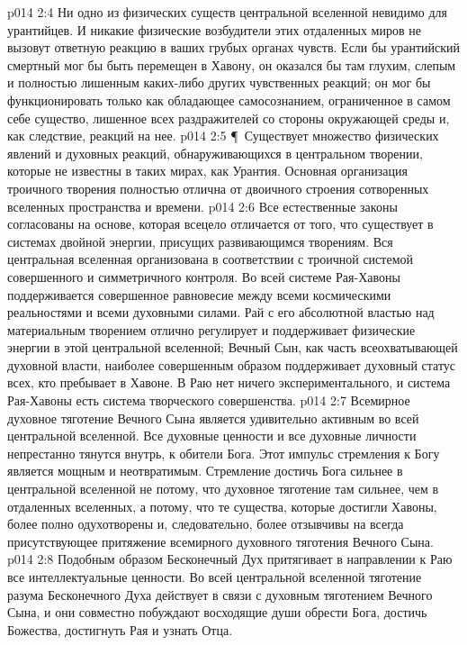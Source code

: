 \vs p014 2:4 Ни одно из физических существ центральной вселенной невидимо для урантийцев. И никакие физические возбудители этих отдаленных миров не вызовут ответную реакцию в ваших грубых органах чувств. Если бы урантийский смертный мог бы быть перемещен в Хавону, он оказался бы там глухим, слепым и полностью лишенным каких\hyp{}либо других чувственных реакций; он мог бы функционировать только как обладающее самосознанием, ограниченное в самом себе существо, лишенное всех раздражителей со стороны окружающей среды и, как следствие, реакций на нее.
\vs p014 2:5 \P\ Существует множество физических явлений и духовных реакций, обнаруживающихся в центральном творении, которые не известны в таких мирах, как Урантия. Основная организация троичного творения полностью отлична от двоичного строения сотворенных вселенных пространства и времени.
\vs p014 2:6 Все естественные законы согласованы на основе, которая всецело отличается от того, что существует в системах двойной энергии, присущих развивающимся творениям. Вся центральная вселенная организована в соответствии с троичной системой совершенного и симметричного контроля. Во всей системе Рая\hyp{}Хавоны поддерживается совершенное равновесие между всеми космическими реальностями и всеми духовными силами. Рай с его абсолютной властью над материальным творением отлично регулирует и поддерживает физические энергии в этой центральной вселенной; Вечный Сын, как часть всеохватывающей духовной власти, наиболее совершенным образом поддерживает духовный статус всех, кто пребывает в Хавоне. В Раю нет ничего экспериментального, и система Рая\hyp{}Хавоны есть система творческого совершенства.
\vs p014 2:7 Всемирное духовное тяготение Вечного Сына является удивительно активным во всей центральной вселенной. Все духовные ценности и все духовные личности непрестанно тянутся внутрь, к обители Бога. Этот импульс стремления к Богу является мощным и неотвратимым. Стремление достичь Бога сильнее в центральной вселенной не потому, что духовное тяготение там сильнее, чем в отдаленных вселенных, а потому, что те существа, которые достигли Хавоны, более полно одухотворены и, следовательно, более отзывчивы на всегда присутствующее притяжение всемирного духовного тяготения Вечного Сына.
\vs p014 2:8 Подобным образом Бесконечный Дух притягивает в направлении к Раю все интеллектуальные ценности. Во всей центральной вселенной тяготение разума Бесконечного Духа действует в связи с духовным тяготением Вечного Сына, и они совместно побуждают восходящие души обрести Бога, достичь Божества, достигнуть Рая и узнать Отца.
